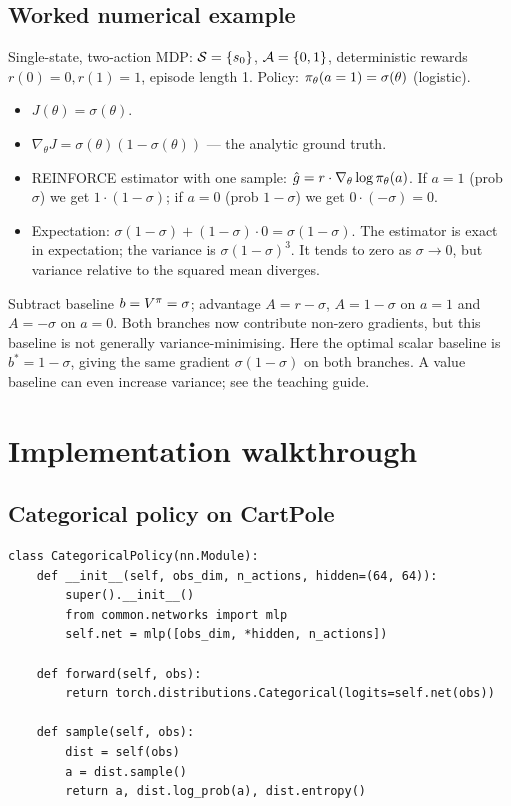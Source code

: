 \documentclass[11pt,oneside]{scrbook}
\begin{document}
\section{Worked numerical example}

Single-state, two-action MDP: $\mathcal{S}=\{s_0\}$, $\mathcal{A}=\{0,1\}$, deterministic rewards $r(0)=0, r(1)=1$, episode length 1. Policy: $\pi_\theta(a=1) = \sigma(\theta)$ (logistic).
\begin{itemize}
  \item $J(\theta) = \sigma(\theta)$.
  \item $\nabla_\theta J = \sigma(\theta)(1-\sigma(\theta))$ --- the analytic ground truth.
  \item REINFORCE estimator with one sample: $\hat g = r \cdot \nabla_\theta \log\pi_\theta(a)$.
        If $a=1$ (prob $\sigma$) we get $1\cdot(1-\sigma)$; if $a=0$ (prob $1-\sigma$) we get $0\cdot(-\sigma)=0$.
  \item Expectation: $\sigma(1-\sigma) + (1-\sigma)\cdot 0 = \sigma(1-\sigma)$. The estimator is exact in expectation; the variance is $\sigma(1-\sigma)^3$. It tends to zero as
        $\sigma\to0$, but variance relative to the squared mean diverges.
\end{itemize}
Subtract baseline $b = V^\pi = \sigma$; advantage $A = r - \sigma$, $A=1-\sigma$ on $a=1$ and $A=-\sigma$ on $a=0$. Both branches now contribute non-zero gradients, but this baseline is
not generally variance-minimising. Here the optimal scalar baseline is
$b^*=1-\sigma$, giving the same gradient $\sigma(1-\sigma)$ on both
branches. A value baseline can even increase variance; see the teaching guide.

\chapter{Implementation walkthrough}

\section{Categorical policy on CartPole}

\begin{verbatim}
class CategoricalPolicy(nn.Module):
    def __init__(self, obs_dim, n_actions, hidden=(64, 64)):
        super().__init__()
        from common.networks import mlp
        self.net = mlp([obs_dim, *hidden, n_actions])

    def forward(self, obs):
        return torch.distributions.Categorical(logits=self.net(obs))

    def sample(self, obs):
        dist = self(obs)
        a = dist.sample()
        return a, dist.log_prob(a), dist.entropy()
\end{verbatim}
\end{document}
